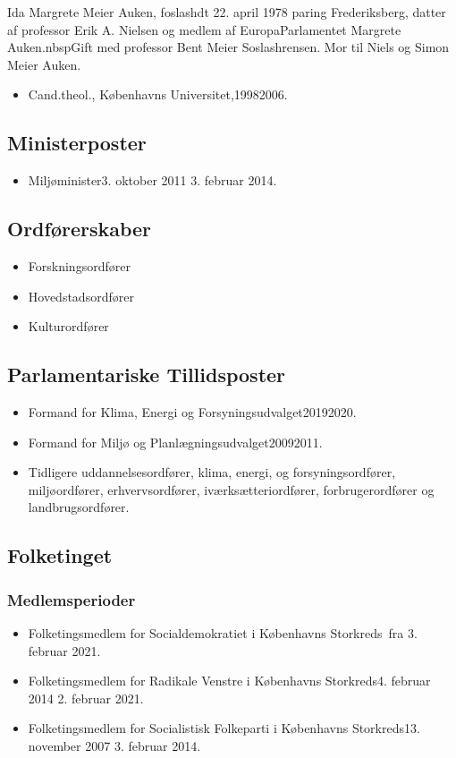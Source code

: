 \documentclass[11pt, a4paper]{awesome-cv}
\begin{document}
\makecvheader[R]
\makelettertitle
\begin{cvletter}
Ida Margrete Meier Auken, foslashdt 22. april 1978 paring Frederiksberg, datter af professor Erik A. Nielsen og medlem af EuropaParlamentet Margrete Auken.nbspGift med professor Bent Meier Soslashrensen. Mor til Niels og Simon Meier Auken.

\begin{itemize}
\item Cand.theol., Københavns Universitet,19982006.
\end{itemize}
\subsection*{Ministerposter}
\begin{itemize}
\item Miljøminister3. oktober 2011  3. februar 2014.
\end{itemize}
\subsection*{Ordførerskaber}
\begin{itemize}
\item Forskningsordfører
\item Hovedstadsordfører
\item Kulturordfører
\end{itemize}
\subsection*{Parlamentariske Tillidsposter}
\begin{itemize}
\item Formand for Klima, Energi og Forsyningsudvalget20192020.
\item Formand for Miljø og Planlægningsudvalget20092011.
\item Tidligere uddannelsesordfører, klima, energi, og forsyningsordfører, miljøordfører, erhvervsordfører, iværksætteriordfører, forbrugerordfører og landbrugsordfører.
\end{itemize}
\subsection*{Folketinget}
\subsubsection*{Medlemsperioder}
\begin{itemize}
\item Folketingsmedlem for Socialdemokratiet i Københavns Storkreds fra 3. februar 2021.
\item Folketingsmedlem for Radikale Venstre i Københavns Storkreds4. februar 2014  2. februar 2021.
\item Folketingsmedlem for Socialistisk Folkeparti i Københavns Storkreds13. november 2007  3. februar 2014.
\end{itemize}

\end{cvletter}
\end{document}
